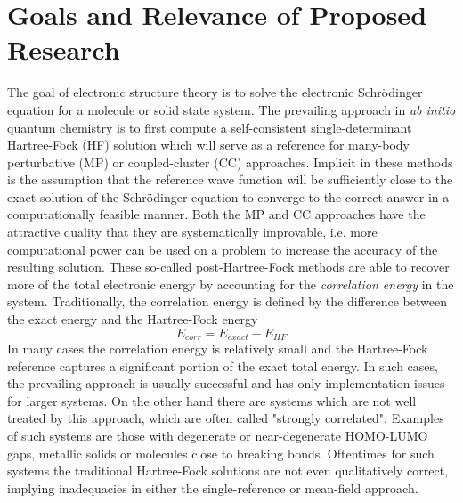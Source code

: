 \documentclass{revtex4}
\begin{document}
    
\newpage
\section{Goals and Relevance of Proposed Research}
    The goal of electronic structure theory is to solve the electronic Schr{\"o}dinger equation
    for a molecule or solid state system. The prevailing approach in \emph{ab initio} quantum 
    chemistry is to first compute a self-consistent single-determinant Hartree-Fock (HF) solution 
    which will serve as a reference for many-body perturbative (MP) or coupled-cluster (CC) 
    approaches.  
    Implicit in these methods is the assumption that the reference wave function will be 
    sufficiently close to the exact solution of the Schr{\"o}dinger equation to converge to the 
    correct 
    answer in a computationally feasible manner. Both the MP and CC approaches have the attractive 
    quality that they are systematically improvable, i.e. more computational power can be used on a 
    problem to increase the accuracy of the resulting solution. These so-called post-Hartree-Fock 
    methods are able to recover more of the total electronic energy by accounting for the 
    \emph{correlation energy} in the system. Traditionally, the correlation energy is defined by 
    the difference between the exact energy and the Hartree-Fock energy \cite{Shavitt2009}
    \begin{equation}\label{correlation_energy}
      E_{corr} = E_{exact} -  E_{HF}
    \end{equation}
    In many cases the correlation energy is relatively small and the Hartree-Fock reference 
    captures a significant portion of the exact total energy. In such cases, the prevailing 
    approach is usually successful and has only implementation issues for larger systems. On the 
    other hand there are systems which are not well treated by this approach, which are often 
    called "strongly correlated". Examples of such systems are those with degenerate or 
    near-degenerate HOMO-LUMO gaps, metallic solids or molecules close to breaking bonds. 
    Oftentimes for such systems the traditional Hartree-Fock solutions are not even qualitatively 
    correct, implying inadequacies in either the single-reference or mean-field approach. 
      
\end{document}
